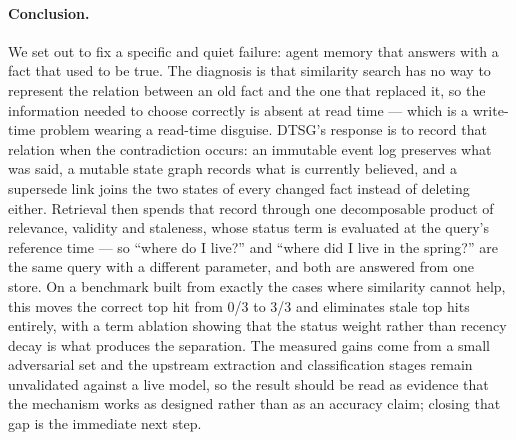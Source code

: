\documentclass[11pt,a4paper]{article}
\begin{document}
\paragraph{Conclusion.} We set out to fix a specific and quiet failure: agent
memory that answers with a fact that used to be true. The diagnosis is that
similarity search has no way to represent the relation between an old fact and
the one that replaced it, so the information needed to choose correctly is
absent at read time --- which is a write-time problem wearing a read-time
disguise. DTSG's response is to record that relation when the contradiction
occurs: an immutable event log preserves what was said, a mutable state graph
records what is currently believed, and a supersede link joins the two states of
every changed fact instead of deleting either. Retrieval then spends that record
through one decomposable product of relevance, validity and staleness, whose
status term is evaluated at the query's reference time --- so ``where do I
live?'' and ``where did I live in the spring?'' are the same query with a
different parameter, and both are answered from one store. On a benchmark built
from exactly the cases where similarity cannot help, this moves the correct top
hit from 0/3 to 3/3 and eliminates stale top hits entirely, with a term ablation
showing that the status weight rather than recency decay is what produces the
separation. The measured gains come from a small adversarial set and the
upstream extraction and classification stages remain unvalidated against a live
model, so the result should be read as evidence that the mechanism works as
designed rather than as an accuracy claim; closing that gap is the immediate
next step.
\end{document}
